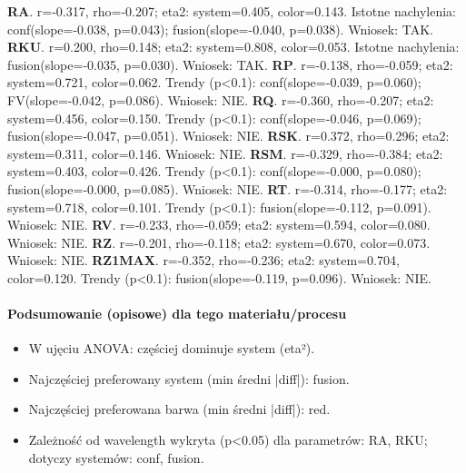 \documentclass[
  10pt,
]{article}
\begin{document}
\textbf{RA}. r=-0.317, rho=-0.207; eta2: system=0.405, color=0.143.
Istotne nachylenia: conf(slope=-0.038, p=0.043); fusion(slope=-0.040,
p=0.038). Wniosek: TAK. \textbf{RKU}. r=0.200, rho=0.148; eta2:
system=0.808, color=0.053. Istotne nachylenia: fusion(slope=-0.035,
p=0.030). Wniosek: TAK. \textbf{RP}. r=-0.138, rho=-0.059; eta2:
system=0.721, color=0.062. Trendy (p\textless0.1): conf(slope=-0.039,
p=0.060); FV(slope=-0.042, p=0.086). Wniosek: NIE. \textbf{RQ}.
r=-0.360, rho=-0.207; eta2: system=0.456, color=0.150. Trendy
(p\textless0.1): conf(slope=-0.046, p=0.069); fusion(slope=-0.047,
p=0.051). Wniosek: NIE. \textbf{RSK}. r=0.372, rho=0.296; eta2:
system=0.311, color=0.146. Wniosek: NIE. \textbf{RSM}. r=-0.329,
rho=-0.384; eta2: system=0.403, color=0.426. Trendy (p\textless0.1):
conf(slope=-0.000, p=0.080); fusion(slope=-0.000, p=0.085). Wniosek:
NIE. \textbf{RT}. r=-0.314, rho=-0.177; eta2: system=0.718, color=0.101.
Trendy (p\textless0.1): fusion(slope=-0.112, p=0.091). Wniosek: NIE.
\textbf{RV}. r=-0.233, rho=-0.059; eta2: system=0.594, color=0.080.
Wniosek: NIE. \textbf{RZ}. r=-0.201, rho=-0.118; eta2: system=0.670,
color=0.073. Wniosek: NIE. \textbf{RZ1MAX}. r=-0.352, rho=-0.236; eta2:
system=0.704, color=0.120. Trendy (p\textless0.1): fusion(slope=-0.119,
p=0.096). Wniosek: NIE.

\paragraph{Podsumowanie (opisowe) dla tego materiału/procesu}
\begin{itemize}
\item W ujęciu ANOVA: częściej dominuje system (eta²).
\item Najczęściej preferowany system (min średni |diff|): fusion.
\item Najczęściej preferowana barwa (min średni |diff|): red.
\item Zależność od wavelength wykryta (p<0.05) dla parametrów: RA, RKU; dotyczy systemów: conf, fusion.
\end{itemize}
\end{document}
